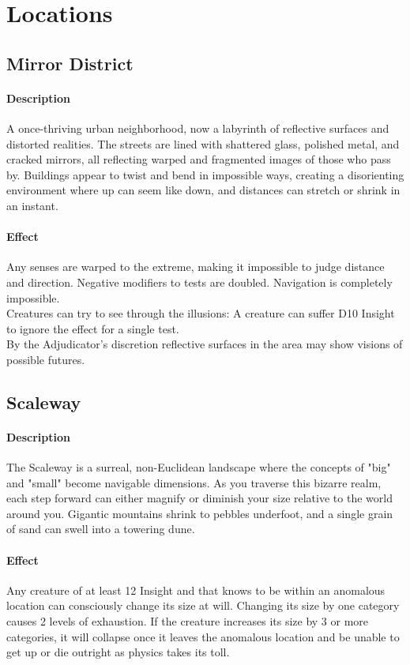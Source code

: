 \section{Locations}
\subsection*{Mirror District}
\paragraph{Description}
A once-thriving urban neighborhood,
	now a labyrinth of reflective surfaces and distorted realities.
The streets are lined with shattered glass, polished metal, and cracked mirrors,
	all reflecting warped and fragmented images of those who pass by.
Buildings appear to twist and bend in impossible ways,
	creating a disorienting environment where up can seem like down,
	and distances can stretch or shrink in an instant.
\paragraph{Effect}
Any senses are warped to the extreme,
	making it impossible to judge distance and direction.
Negative modifiers to tests are doubled.
Navigation is completely impossible.
\\%
Creatures can try to see through the illusions:
A creature can suffer D10 Insight to ignore the effect for a single test.
\\%
By the Adjudicator's discretion reflective surfaces in the area may show visions of possible futures.
\subsection*{Scaleway}
\paragraph{Description}
The Scaleway is a surreal, non-Euclidean landscape
	where the concepts of "big" and "small" become navigable dimensions.
As you traverse this bizarre realm,
	each step forward can either magnify or diminish your size
	relative to the world around you.
Gigantic mountains shrink to pebbles underfoot,
	and a single grain of sand can swell into a towering dune. 
\paragraph{Effect}
Any creature of at least 12 Insight
	and that knows to be within an anomalous location
	can consciously change its size at will.
Changing its size by one category causes 2 levels of exhaustion.
If the creature increases its size by 3 or more categories,
	it will collapse once it leaves the anomalous location
	and be unable to get up or die outright
	as physics takes its toll.

